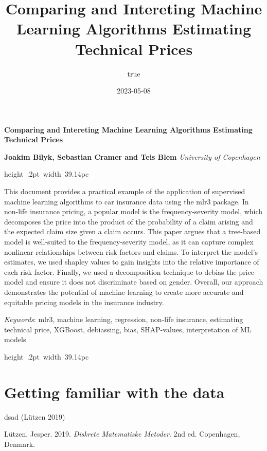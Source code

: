 \documentclass[
]{article}
\title{Comparing and Intereting Machine Learning Algorithms Estimating
Technical Prices}
\author{true}
\date{2023-05-08}
\newlength{\cslhangindent}
\newlength{\cslentryspacingunit} %
\newenvironment{CSLReferences}[2] %
 {%
  \setlength{\parindent}{0pt}
  \ifodd #1
  \let\oldpar\par
  \def\par{\hangindent=\cslhangindent\oldpar}
  \fi
  \setlength{\parskip}{#2\cslentryspacingunit}
 }%
 {}
\begin{document}
\Large\textbf{Comparing and Intereting Machine Learning Algorithms
Estimating Technical Prices}
\normalsize

\noindent \textbf{ Joakim Bilyk, Sebastian Cramer and Teis
Blem} \hfill  \emph{\small University of Copenhagen}   


\hbox{\vrule height .2pt width 39.14pc}

\noindent This document provides a practical example of the application
of supervised machine learning algorithms to car insurance data using
the mlr3 package. In non-life insurance pricing, a popular model is the
frequency-severity model, which decomposes the price into the product of
the probability of a claim arising and the expected claim size given a
claim occurs. This paper argues that a tree-based model is well-suited
to the frequency-severity model, as it can capture complex nonlinear
relationships between risk factors and claims. To interpret the model's
estimates, we used shapley values to gain insights into the relative
importance of each risk factor. Finally, we used a decomposition
technique to debias the price model and ensure it does not discriminate
based on gender. Overall, our approach demonstrates the potential of
machine learning to create more accurate and equitable pricing models in
the insurance industry.


\noindent \emph{Keywords}: mlr3, machine learning, regression, non-life
insurance, estimating technical price, XGBoost, debiassing, bias,
SHAP-values, interpretation of ML models \par

 \hbox{\vrule height .2pt width 39.14pc}




{
\hypersetup{linkcolor=black}
\setcounter{tocdepth}{2}
\tableofcontents
}
\newpage

\hypertarget{getting-familiar-with-the-data}{%
\section{Getting familiar with the
data}\label{getting-familiar-with-the-data}}

dsad (Lützen 2019)

\hypertarget{refs}{}
\begin{CSLReferences}{1}{0}
\leavevmode{}%
Lützen, Jesper. 2019. \emph{Diskrete Matematiske Metoder}. 2nd ed.
Copenhagen, Denmark.

\end{CSLReferences}
\end{document}
